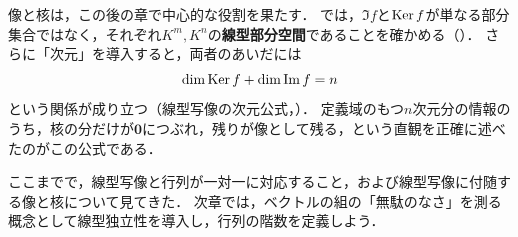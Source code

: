 \begin{mycolumn}
  像と核は，この後の章で中心的な役割を果たす．
  では，$\Im f$と$\operatorname{Ker} f$が単なる部分集合ではなく，それぞれ$K^m,K^n$の\textbf{線型部分空間}であることを確かめる（）．
  さらに「次元」を導入すると，両者のあいだには
  \[
    \dim \operatorname{Ker} f + \dim \operatorname{Im} f = n
  \]
  という関係が成り立つ（線型写像の次元公式，）．
  定義域のもつ$n$次元分の情報のうち，核の分だけが$\bm{0}$につぶれ，残りが像として残る，という直観を正確に述べたのがこの公式である．
\end{mycolumn}

ここまでで，線型写像と行列が一対一に対応すること，および線型写像に付随する像と核について見てきた．
次章では，ベクトルの組の「無駄のなさ」を測る概念として線型独立性を導入し，行列の階数を定義しよう．
